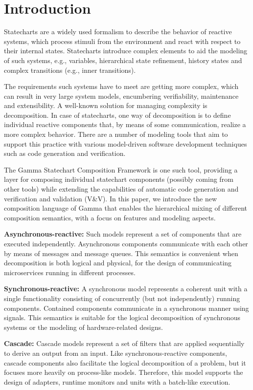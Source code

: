 \section{Introduction}
\label{sec:introduction}
Statecharts \cite{Harel:1987:SVF:34884.34886} are a widely used formalism to describe the behavior of reactive systems, which process stimuli from the environment and react with respect to their internal states. Statecharts introduce complex elements to aid the modeling of such systems, e.g., variables, hierarchical state refinement, history states and complex transitions (e.g., inner transitions).

The requirements such systems have to meet are getting more complex, which can result in very large system models, encumbering verifiability, maintenance and extensibility. A well-known solution for managing complexity is decomposition. In case of statecharts, one way of decomposition is to define individual reactive components that, by means of some communication, realize a more complex behavior. There are a number of modeling tools that aim to support this practice with various model-driven software development techniques such as code generation and verification.

The Gamma Statechart Composition Framework is one such tool, providing a layer for composing individual statechart components (possibly coming from other tools) while extending the capabilities of automatic code generation and verification and validation (V\&V). In this paper, we introduce the new composition language of Gamma that enables the hierarchical mixing of different composition semantics, with a focus on features and modeling aspects.

\textbf{Asynchronous-reactive:} Such models represent a set of components that are executed independently. Asynchronous components communicate with each other by means of messages and message queues. This semantics is convenient when decomposition is both logical and physical, \eg for the design of communicating microservices running in different processes.
	
\textbf{Synchronous-reactive:} A synchronous model represents a coherent unit with a single functionality consisting of concurrently (but not independently) running components. Contained components communicate in a synchronous manner using signals. This semantics is suitable for the logical decomposition of synchronous systems or the modeling of hardware-related designs.
	
\textbf{Cascade:} Cascade models represent a set of filters that are applied sequentially to derive an output from an input. Like synchronous-reactive components, cascade components also facilitate the logical decomposition of a problem, but it focuses more heavily on process-like models. Therefore, this model supports the design of adapters, runtime monitors and units with a batch-like execution.

